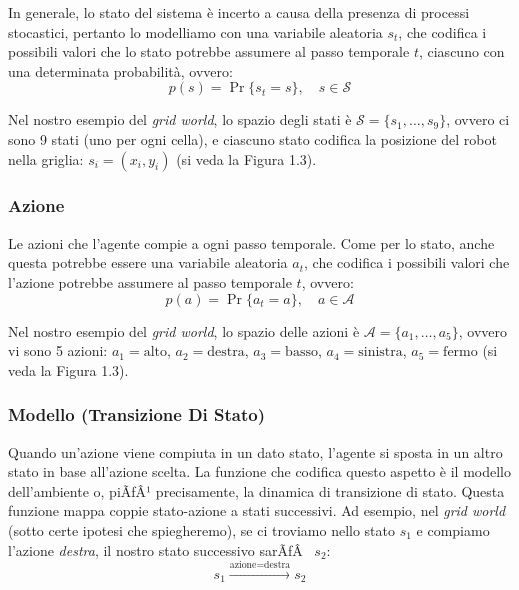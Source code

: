 ﻿\documentclass[11pt, a4paper]{report}
\begin{document}
In generale, lo stato del sistema è incerto a causa della presenza di processi stocastici, pertanto lo modelliamo con una variabile aleatoria $s_t$, che codifica i possibili valori che lo stato potrebbe assumere al passo temporale $t$, ciascuno con una determinata probabilità, ovvero:
\begin{equation}
p(s) = \Pr\{s_t = s\}, \quad s \in \mathcal{S}
\end{equation}

Nel nostro esempio del \emph{grid world}, lo spazio degli stati è $\mathcal{S} = \{s_1, \dots, s_9\}$, ovvero ci sono 9 stati (uno per ogni cella), e ciascuno stato codifica la posizione del robot nella griglia: $s_i = (x_i, y_i)$ (si veda la Figura 1.3).

\subsubsection{Azione}

Le azioni che l'agente compie a ogni passo temporale. Come per lo stato, anche questa potrebbe essere una variabile aleatoria $a_t$, che codifica i possibili valori che l'azione potrebbe assumere al passo temporale $t$, ovvero:
\begin{equation}
p(a) = \Pr\{a_t = a\}, \quad a \in \mathcal{A}
\end{equation}

Nel nostro esempio del \emph{grid world}, lo spazio delle azioni è $\mathcal{A} = \{a_1, \dots, a_5\}$, ovvero vi sono 5 azioni: $a_1 = \text{alto}$, $a_2 = \text{destra}$, $a_3 = \text{basso}$, $a_4 = \text{sinistra}$, $a_5 = \text{fermo}$ (si veda la Figura 1.3).


\newpage

\subsubsection{Modello (Transizione Di Stato)}

Quando un'azione viene compiuta in un dato stato, l'agente si sposta in un altro stato in base all'azione scelta. La funzione che codifica questo aspetto è il modello dell'ambiente o, piÃƒÂ¹ precisamente, la dinamica di transizione di stato. Questa funzione mappa coppie stato-azione a stati successivi. Ad esempio, nel \emph{grid world} (sotto certe ipotesi che spiegheremo), se ci troviamo nello stato $s_1$ e compiamo l'azione \emph{destra}, il nostro stato successivo sarÃƒÂ  $s_2$:
\begin{equation}
s_1 \xrightarrow{\text{azione}=\text{destra}} s_2
\end{equation}
\end{document}
